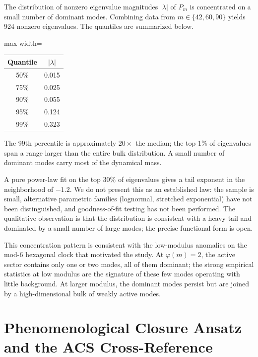\documentclass[11pt,a4paper]{article}
\begin{document}
The distribution of nonzero eigenvalue magnitudes $|\lambda|$ of $P_m$ is concentrated on a small number of dominant modes. Combining data from $m \in \{42, 60, 90\}$ yields 924 nonzero eigenvalues. The quantiles are summarized below.

\begin{center}
\begin{adjustbox}{max width=\linewidth}\begin{tabular}{cc}
\toprule
Quantile & $|\lambda|$ \\
\midrule
50\% & 0.015 \\
75\% & 0.025 \\
90\% & 0.055 \\
95\% & 0.124 \\
99\% & 0.323 \\
\bottomrule
\end{tabular}\end{adjustbox}
\end{center}

The 99th percentile is approximately $20\times$ the median; the top 1\% of eigenvalues span a range larger than the entire bulk distribution. A small number of dominant modes carry most of the dynamical mass.

A pure power-law fit on the top 30\% of eigenvalues gives a tail exponent in the neighborhood of $-1.2$. We do not present this as an established law: the sample is small, alternative parametric families (lognormal, stretched exponential) have not been distinguished, and goodness-of-fit testing has not been performed. The qualitative observation is that the distribution is consistent with a heavy tail and dominated by a small number of large modes; the precise functional form is open.

This concentration pattern is consistent with the low-modulus anomalies on the mod-6 hexagonal clock that motivated the study. At $\varphi(m) = 2$, the active sector contains only one or two modes, all of them dominant; the strong empirical statistics at low modulus are the signature of these few modes operating with little background. At larger modulus, the dominant modes persist but are joined by a high-dimensional bulk of weakly active modes.

\section{Phenomenological Closure Ansatz and the ACS Cross-Reference}
\label{sec:bridge}
\end{document}
